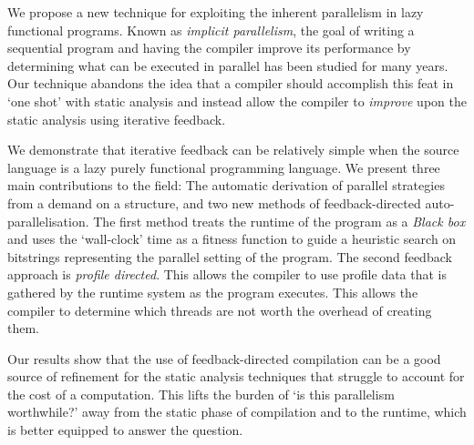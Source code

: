 We propose a new technique for exploiting the inherent parallelism in lazy
functional programs. Known as \emph{implicit parallelism}, the goal of writing
a sequential program and having the compiler improve its performance by
determining what can be executed in parallel has been studied for many years.
Our technique abandons the idea that a compiler should accomplish this feat in
`one shot' with static analysis and instead allow the compiler to
\emph{improve} upon the static analysis using iterative feedback.

We demonstrate that iterative feedback can be relatively simple when the source
language is a lazy purely functional programming language. We present three
main contributions to the field: The automatic derivation of parallel
strategies from a demand on a structure, and two new methods of
feedback-directed auto-parallelisation. The first method treats the runtime of
the program as a \emph{Black box} and uses the `wall-clock' time as a fitness
function to guide a heuristic search on bitstrings representing the parallel
setting of the program. The second feedback approach is \emph{profile
directed}. This allows the compiler to use profile data that is gathered by the
runtime system as the program executes. This allows the compiler to determine
which threads are not worth the overhead of creating them.

Our results show that the use of feedback-directed compilation can be a good
source of refinement for the static analysis techniques that struggle to
account for the cost of a computation. This lifts the burden of `is this
parallelism worthwhile?' away from the static phase of compilation and to the
runtime, which is better equipped to answer the question.
